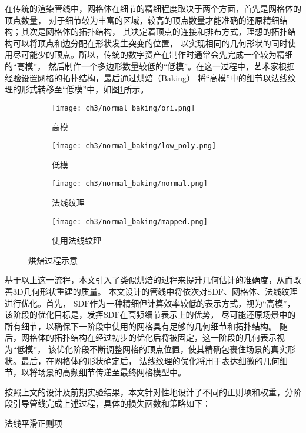 在传统的渲染管线中，网格体在细节的精细程度取决于两个方面，首先是网格体的顶点数量，
对于细节较为丰富的区域，较高的顶点数量才能准确的还原精细结构；其次是网格体的拓扑结构，
其决定着顶点的连接和排布方式，理想的拓扑结构可以将顶点和边分配在形状发生突变的位置，
以实现相同的几何形状的同时使用尽可能少的顶点。所以，传统的数字资产在制作时通常会先完成一个较为精细的“高模”，
然后制作一个多边形数量较低的“低模”。在这一过程中，艺术家根据经验设置网格的拓扑结构，最后通过烘焙（Baking）
将“高模”中的细节以法线纹理的形式转移至“低模”中，如图\ref{fig:baking_normal}所示。
\begin{figure}[H]
  \centering
  \begin{subfigure}[t]{0.24\textwidth}
    \centering
    \texttt{[image: ch3/normal\_baking/ori.png]}
    \caption{高模}
  \end{subfigure}
  \begin{subfigure}[t]{0.24\textwidth}
    \centering
    \texttt{[image: ch3/normal\_baking/low\_poly.png]}
    \caption{低模}
  \end{subfigure}
  \begin{subfigure}[t]{0.24\textwidth}
    \centering
    \texttt{[image: ch3/normal\_baking/normal.png]}
    \caption{法线纹理}
  \end{subfigure}
  \begin{subfigure}[t]{0.24\textwidth}
    \centering
    \texttt{[image: ch3/normal\_baking/mapped.png]}
    \caption{使用法线纹理}
  \end{subfigure}
  \caption{烘焙过程示意}
  \label{fig:baking_normal}
\end{figure}
基于以上这一流程，本文引入了类似烘焙的过程来提升几何估计的准确度，从而改善3D几何形状重建的质量。
本文设计的管线中将依次对SDF、网格体、法线纹理进行优化。首先，
SDF作为一种精细但计算效率较低的表示方式，视为“高模”，该阶段的优化目标是，发挥SDF在高频细节表示上的优势，
尽可能还原场景中的所有细节，以确保下一阶段中使用的网格具有足够的几何细节和拓扑结构。
随后，网格体的拓扑结构在经过初步的优化后将被固定，这一阶段的几何表示视为“低模”，
该优化阶段不断调整网格的顶点位置，使其精确包裹住场景的真实形状。最后，在网格体的形状确定后，
法线纹理的优化将用于表达细微的几何细节，以将场景的高频细节传递至最终网格模型中。

按照上文的设计及前期实验结果，本文针对性地设计了不同的正则项和权重，分阶段引导管线完成上述过程，具体的损失函数和策略如下：

法线平滑正则项

